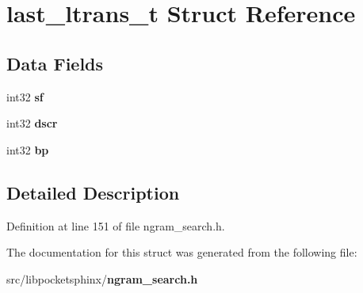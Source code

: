 \section{last\+\_\+ltrans\+\_\+t Struct Reference}
\label{structlast__ltrans__t}
\subsection*{Data Fields}
\begin{DoxyCompactItemize}
\item 
int32 {\bfseries sf}\label{structlast__ltrans__t_acaf16ee92b14121c8e357ff4c1c517d7}

\item 
int32 {\bfseries dscr}\label{structlast__ltrans__t_acef04cbac672e225406402f56002c153}

\item 
int32 {\bfseries bp}\label{structlast__ltrans__t_ae42bf37affec23a3f3ea46131aa82c99}

\end{DoxyCompactItemize}


\subsection{Detailed Description}


Definition at line 151 of file ngram\+\_\+search.\+h.



The documentation for this struct was generated from the following file\+:\begin{DoxyCompactItemize}
\item 
src/libpocketsphinx/{\bf ngram\+\_\+search.\+h}\end{DoxyCompactItemize}
